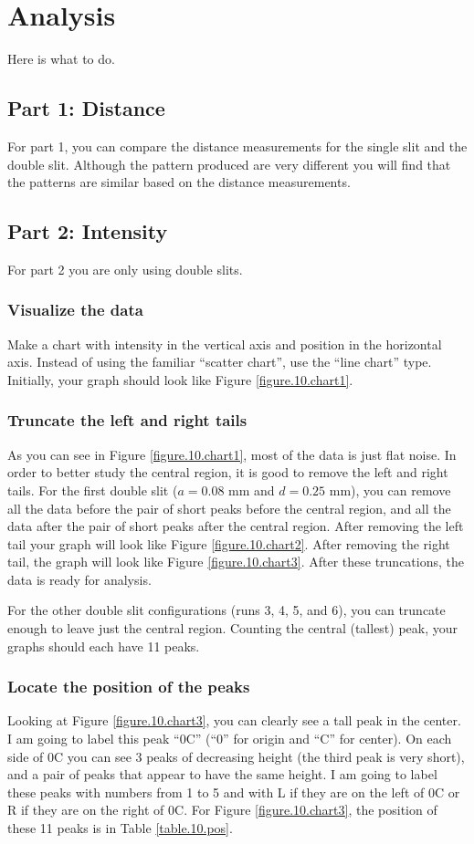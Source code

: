 \section{Analysis}
%
Here is what to do.
%
\subsection{Part 1: Distance}
%
For part 1, you can compare the distance measurements for the single slit and the double slit. Although the pattern produced are very different you will find that the patterns are similar based on the distance measurements.
%
\subsection{Part 2: Intensity}
%
For part 2 you are only using double slits.
%
\subsubsection{Visualize the data}
%
Make a chart with intensity in the vertical axis and position in the horizontal axis. Instead of using the familiar ``scatter chart'', use the ``line chart'' type. Initially, your graph should look like Figure \ref{figure.10.chart1}.
%
\subsubsection{Truncate the left and right tails}
%
As you can see in Figure \ref{figure.10.chart1}, most of the data is just flat noise. In order to better study the central region, it is good to remove the left and right tails. For the first double slit ($a = 0.08$ mm and $d = 0.25$ mm), you can remove all the data before the pair of short peaks before the central region, and all the data after the pair of short peaks after the central region. After removing the left tail your graph will look like Figure \ref{figure.10.chart2}. After removing the right tail, the graph will look like Figure \ref{figure.10.chart3}. After these truncations, the data is ready for analysis.

For the other double slit configurations (runs 3, 4, 5, and 6), you can truncate enough to leave just the central region. Counting the central (tallest) peak, your graphs should each have 11 peaks.
%
\subsubsection{Locate the position of the peaks}
%
Looking at Figure \ref{figure.10.chart3}, you can clearly see a tall peak in the center. I am going to label this peak ``0C'' (``0'' for origin and ``C'' for center). On each side of 0C you can see 3 peaks of decreasing height (the third peak is very short), and a pair of peaks that appear to have the same height. I am going to label these peaks with numbers from 1 to 5 and with L if they are on the left of 0C or R if they are on the right of 0C. For Figure \ref{figure.10.chart3}, the position of these 11 peaks is in Table \ref{table.10.pos}.
%
